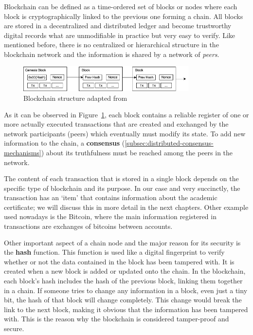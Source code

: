 Blockchain can be defined as a time-ordered set of blocks or nodes where each block is cryptographically linked to the previous one forming a chain. All blocks are stored in a decentralized and distributed ledger and become
trustworthy digital records what are unmodifiable in practice but very easy to verify. Like mentioned before, there is no centralized or hierarchical structure in the blockchain network and the information is shared by a network of \textit{peers}.

\begin{figure}[h]\label{fig:blockchain}
    \begin{center}
        \includegraphics[width=0.8\textwidth]{assets/blockchain.png}
        \caption{Blockchain structure adapted from~\cite{nakamoto2008bitcoin}}
    \end{center}
\end{figure}

As it can be observed in Figure~\ref{fig:blockchain}, each block contains a reliable register of one or more actually executed transactions that are created and exchanged by the network participants (peers) which eventually must modify
its state. To add new information to the chain, a \textbf{consensus} (\ref{subsec:distributed-consensus-mechanisms}) about its truthfulness must be reached among the peers in the network.

The content of each transaction that is stored in a single block depends on the specific type of blockchain and its purpose. In our case and very succinctly, the transaction has an `item' that contains information about the academic certificate; we will discuss this in more detail in the next chapters. Other example used nowadays is the Bitcoin, where the main information registered in transactions are exchanges of bitcoins between accounts.

Other important aspect of a chain node and the major reason for its security is the \textbf{hash} function.
This function is used like a digital fingerprint to verify whether or not the data contained in the block has been tampered with. It is created when a new block is added or updated onto the chain.
In the blockchain, each block's hash includes the hash of the previous block, linking them together in a chain. If someone tries to change any information in a block, even just a tiny bit, the hash of that block will change completely. This change would break the link to the next block, making it obvious that the information has been tampered with.
This is the reason why the blockchain is considered tamper-proof and secure.


